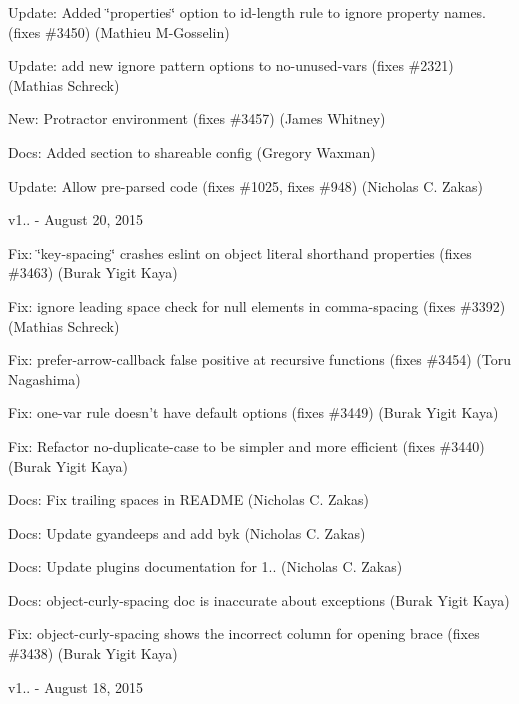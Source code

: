 \begin{DoxyItemize}
\item Update\+: Added \char`\"{}properties\char`\"{} option to {\ttfamily id-\/length} rule to ignore property names. (fixes \#3450) (Mathieu M-\/\+Gosselin)
\item Update\+: add new ignore pattern options to no-\/unused-\/vars (fixes \#2321) (Mathias Schreck)
\item New\+: Protractor environment (fixes \#3457) (James Whitney)
\item Docs\+: Added section to shareable config (Gregory Waxman)
\item Update\+: Allow pre-\/parsed code (fixes \#1025, fixes \#948) (Nicholas C. Zakas)
\end{DoxyItemize}

v1.. -\/ August 20, 2015


\begin{DoxyItemize}
\item Fix\+: \char`\"{}key-\/spacing\char`\"{} crashes eslint on object literal shorthand properties (fixes \#3463) (Burak Yigit Kaya)
\item Fix\+: ignore leading space check for {\ttfamily null} elements in comma-\/spacing (fixes \#3392) (Mathias Schreck)
\item Fix\+: {\ttfamily prefer-\/arrow-\/callback} false positive at recursive functions (fixes \#3454) (Toru Nagashima)
\item Fix\+: one-\/var rule doesn’t have default options (fixes \#3449) (Burak Yigit Kaya)
\item Fix\+: Refactor {\ttfamily no-\/duplicate-\/case} to be simpler and more efficient (fixes \#3440) (Burak Yigit Kaya)
\item Docs\+: Fix trailing spaces in R\+E\+A\+D\+ME (Nicholas C. Zakas)
\item Docs\+: Update gyandeeps and add byk (Nicholas C. Zakas)
\item Docs\+: Update plugins documentation for 1.. (Nicholas C. Zakas)
\item Docs\+: {\ttfamily object-\/curly-\/spacing} doc is inaccurate about exceptions (Burak Yigit Kaya)
\item Fix\+: {\ttfamily object-\/curly-\/spacing} shows the incorrect column for opening brace (fixes \#3438) (Burak Yigit Kaya)
\end{DoxyItemize}

v1.. -\/ August 18, 2015


